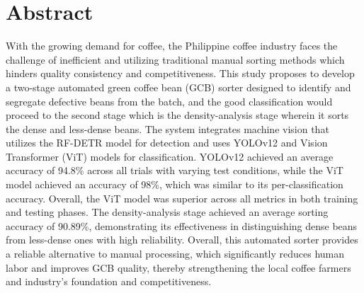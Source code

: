 \chapter*{Abstract}

With the growing demand for coffee, the Philippine coffee industry faces the challenge of inefficient and utilizing traditional manual sorting methods which hinders quality consistency and competitiveness. This study proposes to develop a two-stage automated green coffee bean (GCB) sorter designed to identify and segregate defective beans from the batch, and the good classification would proceed to the second stage which is the density-analysis stage wherein it sorts the dense and less-dense beans. The system integrates machine vision that utilizes the RF-DETR model for detection and uses YOLOv12 and Vision Transformer (ViT) models for classification. YOLOv12 achieved an average accuracy of 94.8\% across all trials with varying test conditions, while the ViT model achieved an accuracy of 98\%, which was similar to its per-classification accuracy. Overall, the ViT model was superior across all metrics in both training and testing phases. The density-analysis stage achieved an average sorting accuracy of 90.89\%, demonstrating its effectiveness in distinguishing dense beans from less-dense ones with high reliability. Overall, this automated sorter provides a reliable alternative to manual processing, which significantly reduces human labor and improves GCB quality, thereby strengthening the local coffee farmers and industry’s foundation and competitiveness.

